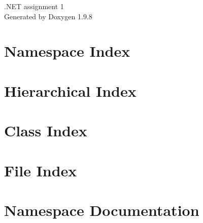 \documentclass[twoside]{book}
\newcommand{\+}{\discretionary{\mbox{\scriptsize$\hookleftarrow$}}{}{}}
\newcommand{\clearemptydoublepage}{%
    \newpage{\pagestyle{empty}\cleardoublepage}%
  }
\begin{document}
  \raggedbottom
    \hypersetup{pageanchor=false,
                bookmarksnumbered=true,
                pdfencoding=unicode
               }
  \begin{titlepage}
  \vspace*{7cm}
  \begin{center}%
  {\Large .\+NET assignment 1}\\
  \vspace*{1cm}
  {\large Generated by Doxygen 1.9.8}\\
  \end{center}
  \end{titlepage}
  \clearemptydoublepage
  \tableofcontents
  \clearemptydoublepage
  \hypersetup{pageanchor=true}

\chapter{Namespace Index}

\chapter{Hierarchical Index}

\chapter{Class Index}

\chapter{File Index}

\chapter{Namespace Documentation}
























\end{document}
